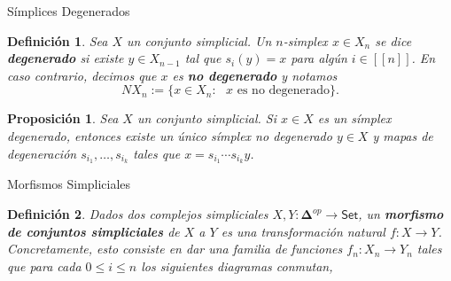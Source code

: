 \documentclass[11pt]{beamer}
\newcommand{\nat}[1]{[\![#1]\!]}
\newcommand{\ord}[1]{\nat{#1}}
\newcommand{\cat}[1]{\mathsf{#1}}
\newcommand{\ordcat}{\boldsymbol{\Delta}}
\newtheorem{defs}{Definición}
\newtheorem{prop}{Proposición}
\begin{document}
\begin{frame}{Símplices Degenerados}
\begin{defs} Sea $X$ un conjunto simplicial. Un $n$-simplex $x \in X_n$ se dice \textbf{degenerado} si existe $y \in X_{n-1}$ tal que $s_i(y) = x$ para algún $i \in \ord{n}$. En caso contrario, decimos que $x$ es \textbf{no degenerado} y notamos 
\[
NX_n := \{x \in X_n : \text{ $x$ es no degenerado}\}.
\]
\end{defs}

\begin{prop}  Sea $X$ un conjunto simplicial. Si $x \in X$ es un símplex degenerado, entonces existe un único símplex no degenerado $y \in X$ y mapas de degeneración $s_{i_1},\dots, s_{i_k}$ tales que $x = s_{i_1} \cdots s_{i_k}y$.
\end{prop}
\end{frame}

\begin{frame}{Morfismos Simpliciales}

\begin{defs} Dados dos complejos simpliciales $X,Y : \ordcat^{op} \to \cat{Set}$, un \textbf{morfismo de conjuntos simpliciales} de $X$ a $Y$ es una transformación natural $f : X \to Y$. Concretamente, esto consiste en dar una familia de funciones $f_n : X_n \to Y_n$ tales que para cada $0 \leq i \leq n$  los siguientes diagramas conmutan,
\begin{center}
\end{center}
\end{defs}
\end{frame}
\end{document}
